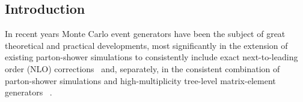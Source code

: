 





\subsection{Introduction}

In recent years Monte Carlo event generators have been the subject of great
theoretical and practical developments, most significantly in the extension
of existing parton-shower simulations to consistently include exact
next-to-leading order (NLO) corrections~\cite{Frixione:2002ik,
Frixione:2003ei,Frixione:2005vw,Frixione:2006gn,Frixione:2007zp,Frixione:2008yi,
LatundeDada:2007jg,Nason:2004rx,Nason:2006hfa,Frixione:2007nu,Frixione:2007vw,
Frixione:2007nw,LatundeDada:2006gx,Hamilton:2008pd,Hamilton:2009za,
Alioli:2008gx,Alioli:2008tz,Alioli:2009je,LatundeDada:2008bv}  
and, separately, in the consistent combination of parton-shower simulations 
and high-multiplicity tree-level matrix-element generators~%
\cite{Mangano:2001xp,Catani:2001cc,Lonnblad:2001iq,Krauss:2002up,
Mrenna:2003if,Schalicke:2005nv,Alwall:2007fs,Hoeche:2009rj,Hamilton:2009ne}.  

